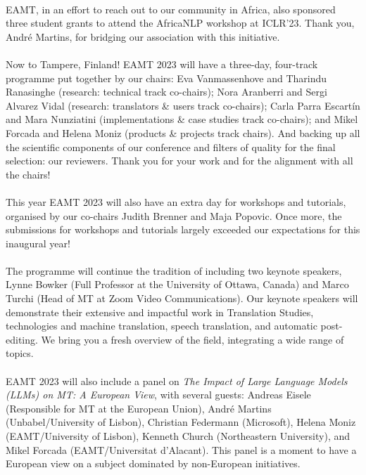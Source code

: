 \documentclass[a4paper,11pt,twoside]{book}
\begin{document}
\begin{onehalfspacing}
\\
\noindent
EAMT, in an effort to reach out to our community in Africa, also sponsored three student grants to attend the AfricaNLP workshop at ICLR'23. Thank you, André Martins, for bridging our association with this initiative.\\
\\
\noindent
Now to Tampere, Finland! EAMT 2023 will have a three-day, four-track programme put together by our chairs: Eva Vanmassenhove and Tharindu Ranasinghe (research: technical track co-chairs); Nora Aranberri and Sergi Alvarez Vidal (research: translators \& users track co-chairs); Carla Parra Escartín and Mara Nunziatini (implementations \& case studies track co-chairs); and Mikel Forcada and Helena Moniz (products \& projects track chairs). And backing up all the scientific components of our conference and filters of quality for the final selection: our reviewers. Thank you for your work and for the alignment with all the chairs!\\ 
\\
\noindent
This year EAMT 2023 will also have an extra day for workshops and tutorials, organised by our co-chairs Judith Brenner and Maja Popovic. Once more, the submissions for workshops and tutorials largely exceeded our expectations for this inaugural year!\\ 
\\
\noindent
The programme will continue the tradition of including two keynote speakers, Lynne Bowker (Full Professor at the University of Ottawa, Canada) and Marco Turchi (Head of MT at Zoom Video Communications). Our keynote speakers will demonstrate their extensive and impactful work in Translation Studies, technologies and machine translation, speech translation, and automatic post-editing. We bring you a fresh overview of the field, integrating a wide range of topics.\\
\\
\noindent
EAMT 2023 will also include a panel on \emph{The Impact of Large Language Models (LLMs) on MT: A European View}, with several guests: Andreas Eisele (Responsible for MT at the European Union), André Martins (Unbabel/University of Lisbon), Christian Federmann (Microsoft), Helena Moniz (EAMT/University of Lisbon), Kenneth Church (Northeastern University), and Mikel Forcada (EAMT/Universitat d’Alacant). This panel is a moment to have a European view on a subject dominated by non-European initiatives.\\
\\
\noindent

\end{onehalfspacing}
\end{document}
